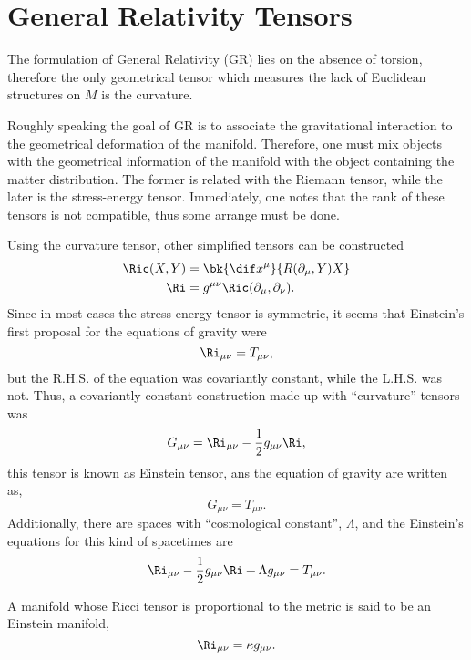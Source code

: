 \section{General Relativity Tensors}

The formulation of General Relativity (GR) lies on the absence of torsion, therefore the only geometrical tensor which measures the lack of Euclidean structures on $M$ is the curvature.

Roughly speaking the goal of GR is to associate the gravitational interaction to the geometrical deformation of the manifold. Therefore, one must mix objects with the geometrical information of the manifold with the object containing the matter distribution. The former is related with the Riemann tensor, while the later is the stress-energy tensor. Immediately, one notes that the rank of these tensors is not compatible, thus some arrange must be done.

Using the curvature tensor, other simplified tensors can be constructed
\begin{align}
  \Ric(X,Y) &= \bk{\dif x^\mu}{R(\partial_\mu,Y)X}\\
  \Ri &= g^{\mu \nu}\Ric(\partial_\mu,\partial_\nu).
\end{align}
Since in most cases the stress-energy tensor is symmetric, it seems that Einstein's first proposal for the equations of gravity were
\begin{equation}
  \Ri_{\mu \nu} = T_{\mu \nu},
\end{equation}
but the R.H.S. of the equation was covariantly constant, while the L.H.S. was not. Thus, a covariantly constant construction made up with ``curvature'' tensors was
\begin{equation}
  G_{\mu \nu} = \Ri_{\mu \nu} - \frac{1}{2} g_{\mu \nu} \Ri,
\end{equation}
this tensor is known as Einstein tensor, ans the equation of gravity are written as,
\begin{equation}
  G_{\mu \nu} = T_{\mu \nu}.
\end{equation}
Additionally, there are spaces with ``cosmological constant'', $\Lambda$, and the Einstein's equations for this kind of spacetimes are
\begin{equation}
  \Ri_{\mu \nu} - \frac{1}{2}g_{\mu\nu} \Ri + \Lambda g_{\mu \nu} = T_{\mu \nu}.
\end{equation}

A manifold whose Ricci tensor is proportional to the metric is said to be an Einstein manifold,
\begin{equation}
  \Ri_{\mu\nu} = \kappa g_{\mu \nu}.
  \label{def-const-curv}
\end{equation}


